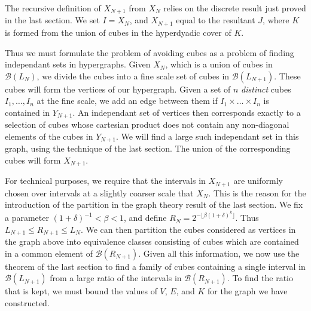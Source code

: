 \documentclass{article}
\theoremstyle{plain}
\theoremstyle{plain}
\begin{document}
The recursive definition of $X_{N+1}$ from $X_N$ relies on the discrete result just proved in the last section. We set $I = X_N$, and $X_{N+1}$ equal to the resultant $J$, where $K$ is formed from the union of cubes in the hyperdyadic cover of $K$.

Thus we must formulate the problem of avoiding cubes as a problem of finding independant sets in hypergraphs. Given $X_N$, which is a union of cubes in $\mathcal{B}(L_N)$, we divide the cubes into a fine scale set of cubes in $\mathcal{B}(L_{N+1})$. These cubes will form the vertices of our hypergraph. Given a set of $n$ {\it distinct} cubes $I_1, \dots, I_n$ at the fine scale, we add an edge between them if $I_1 \times \dots \times I_n$ is contained in $Y_{N+1}$. An independant set of vertices then corresponds exactly to a selection of cubes whose cartesian product does not contain any non-diagonal elements of the cubes in $Y_{N+1}$. We will find a large such independant set in this graph, using the technique of the last section. The union of the corresponding cubes will form $X_{N+1}$.

For technical purposes, we require that the intervals in $X_{N+1}$ are uniformly chosen over intervals at a slightly coarser scale that $X_N$. This is the reason for the introduction of the partition in the graph theory result of the last section. We fix a parameter $(1 + \delta)^{-1} < \beta < 1$, and define $R_N = 2^{-\lfloor \beta(1 + \delta)^k \rfloor}$. Thus $L_{N+1} \leq R_{N+1} \leq L_N$. We can then partition the cubes considered as vertices in the graph above into equivalence classes consisting of cubes which are contained in a common element of $\mathcal{B}(R_{N+1})$. Given all this information, we now use the theorem of the last section to find a family of cubes containing a single interval in $\mathcal{B}(L_{N+1})$ from a large ratio of the intervals in $\mathcal{B}(R_{N+1})$. To find the ratio that is kept, we must bound the values of $V$, $E$, and $K$ for the graph we have constructed.
\end{document}
